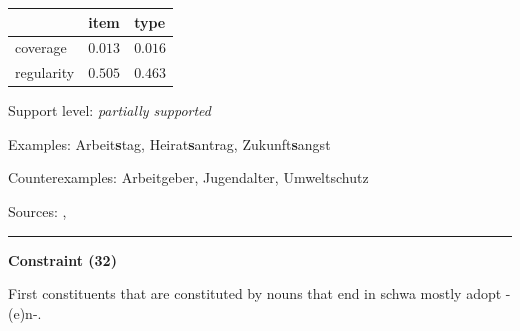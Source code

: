 \vspace{-0.25em}

\begin{table}[!ht]
\begin{center}
\setlength{\extrarowheight}{1pt}
\begin{tabularx}{\columnwidth}{|X|X|X|}
\hline
 & item & type \\
\hline
 coverage & $0.013$ & $0.016$ \\
\hline
 regularity & $0.505$ & $0.463$ \\
\hline
\end{tabularx}
\end{center}
\end{table}

\vspace{-1.35em}

\noindent
Support level: \textit{partially supported}

\vspace{0.3em}

\noindent
Examples: Arbeit\textbf{s}tag, Heirat\textbf{s}antrag, Zukunft\textbf{s}angst

\noindent
Counterexamples: Arbeit{\zeroLinker}geber, Jugend{\zeroLinker}alter, Umwelt{\zeroLinker}schutz

\vspace{0.3em}

\noindent
Sources: \citet[77]{nuebling_szczepaniak_2013}, \citet[74, 75]{ortner_mueller-bollhagen_1991}

\vspace{0.35em}
\hrule




\vspace{0.4em}

\begin{center}
\textbf{Constraint (32)}
\end{center}

\noindent
First constituents that are constituted by nouns that end in schwa mostly adopt -(e)n-.
\vspace{0.5em}


